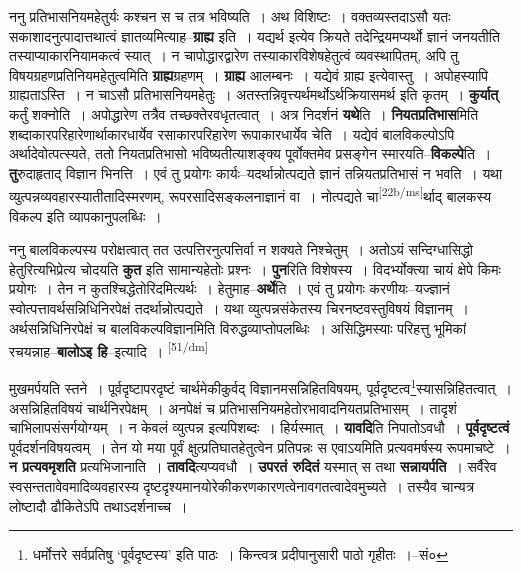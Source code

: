 \documentclass[article,12pt,a4paper]{memoir}
\begin{document}
	  \pstart ननु प्रतिभासनियमहेतुर्यः कश्चन स च तत्र भविष्यति । अथ विशिष्टः । वक्तव्यस्तदाऽसौ यतः सकाशादनुत्पादात्तथात्वं ज्ञातव्यमित्याह--\textbf{ग्राह्य} इति । यद्यर्थ इत्येव क्रियते तदेन्द्रियमप्यर्थो ज्ञानं जनयतीति तस्याप्याकारनियामकत्वं स्यात् । न चापोद्धारद्वारेण तस्याकारविशेषहेतुत्वं व्यवस्थापितम्, अपि तु विषयग्रहणप्रतिनियमहेतुत्वमिति \textbf{ग्राह्य}ग्रहणम् । \textbf{ग्राह्य} आलम्बनः । यद्येवं ग्राह्य इत्येवास्तु । अपोहस्यापि ग्राह्यताऽस्ति । न चाऽसौ प्रतिभासनियमहेतुः । अतस्तन्निवृत्त्यर्थमर्थोऽर्थक्रियासमर्थ इति कृतम् । \textbf{कुर्यात्} कर्तुं शक्नोति । अपोद्धारेण तत्रैव तच्छक्तेरवधृतत्वात् । अत्र निदर्शनं \textbf{यथे}ति । \textbf{नियतप्रतिभास}मिति शब्दाकारपरिहारेणार्थाकारधार्येव रसाकारपरिहारेण रूपाकारधार्येव चेति । यद्येवं बालविकल्पोऽपि अर्थादेवोत्पत्स्यते, ततो नियतप्रतिभासो भविष्यतीत्याशङ्क्य पूर्वोक्तमेव प्रसङ्गेन स्मारयति--\textbf{विकल्पे}ति । \textbf{तु}रुदाहृताद् विज्ञान भिनत्ति । एवं तु प्रयोगः कार्यः--यदर्थान्नोत्पद्यते ज्ञानं तन्नियतप्रतिभासं न भवति । यथा व्युत्पन्नव्यवहारस्यातीतादिस्मरणम्, रूपरसादिसङ्कलनाज्ञानं वा । नोत्पद्यते चा\leavevmode\textsuperscript{\rmlatinfont\tiny [22b/ms]}र्थाद् बालकस्य विकल्प इति व्यापकानुपलब्धिः ।
	\pend
      

	  \pstart ननु बालविकल्पस्य परोक्षत्वात् तत उत्पत्तिरनुत्पत्तिर्वा न शक्यते निश्चेतुम् । अतोऽयं सन्दिग्धासिद्धो हेतुरित्यभिप्रेत्य चोदयति \textbf{कुत} इति सामान्यहेतोः प्रश्नः । \textbf{पुन}रिति विशेषस्य । विदर्भ्योक्त्या चायं क्षेपे किमः प्रयोगः । तेन न कुतश्चिद्धेतोरिदमित्यर्थः । हेतुमाह--\textbf{अर्थे}ति । एवं तु प्रयोगः करणीयः--यज्ज्ञानं स्वोत्पत्तावर्थसन्निधिनिरपेक्षं तदर्थान्नोत्पद्यते । यथा व्युत्पन्नसंकेतस्य चिरनष्टवस्तुविषयं विज्ञानम् । अर्थसन्निधिनिरपेक्षं च बालविकल्पविज्ञानमिति विरुद्धव्याप्तोपलब्धिः । असिद्धिमस्याः परिहत्तु भूमिकां रचयन्नाह--\textbf{बालोऽइ हि}--इत्यादि । \leavevmode\textsuperscript{\rmlatinfont\tiny [51/dm]} 
	  
	मुखमर्पयति स्तने । पूर्वदृष्टापरदृष्टं चार्थमेकीकुर्वद् विज्ञानमसन्निहितविषयम्, पूर्वदृष्टत्व\footnote{धर्मोत्तरे सर्वप्रतिषु ‘पूर्वदृष्टस्य’ इति पाठः । किन्त्वत्र प्रदीपानुसारी पाठो गृहीतः ।--सं०}स्यासन्निहितत्वात् । असन्निहितविषयं चार्थनिरपेक्षम् । अनपेक्षं च प्रतिभासनियमहेतोरभावादनियतप्रतिभासम् । तादृशं चाभिलापसंसर्गयोग्यम् । न केवलं व्युत्पन्न इत्यपिशब्दः । हिर्यस्मात् । \textbf{यावदि}ति निपातोऽवधौ । \textbf{पूर्वदृष्टत्वं} पूर्वदर्शनविषयत्वम् । तेन यो मया पूर्वं क्षुत्प्रतिघातहेतुत्वेन प्रतिपन्नः स एवाऽयमिति प्रत्यवमर्षस्य रूपमाचष्टे । \textbf{न प्रत्यवमृशति} प्रत्यभिजानाति । \textbf{तावदि}त्यप्यवधौ । \textbf{उपरतं रुदितं} यस्मात् स तथा \textbf{सन्नायर्पति} । सर्वैरेव स्वसन्ततावेवमादिव्यवहारस्य दृष्टदृश्यमानयोरेकीकरणकारणत्वेनावगतत्वादेवमुच्यते । तस्यैव चान्यत्र लोष्टादौ ढौकितेऽपि तथाऽदर्शनाच्च ।
	\pend
      
\end{document}
